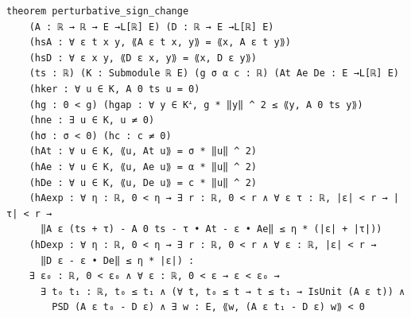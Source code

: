 \begin{theorem}[bp-325]
\begin{verbatim}
theorem perturbative_sign_change
    (A : ℝ → ℝ → E →L[ℝ] E) (D : ℝ → E →L[ℝ] E)
    (hsA : ∀ ε t x y, ⟪A ε t x, y⟫ = ⟪x, A ε t y⟫)
    (hsD : ∀ ε x y, ⟪D ε x, y⟫ = ⟪x, D ε y⟫)
    (ts : ℝ) (K : Submodule ℝ E) (g σ α c : ℝ) (At Ae De : E →L[ℝ] E)
    (hker : ∀ u ∈ K, A 0 ts u = 0)
    (hg : 0 < g) (hgap : ∀ y ∈ Kᗮ, g * ‖y‖ ^ 2 ≤ ⟪y, A 0 ts y⟫)
    (hne : ∃ u ∈ K, u ≠ 0)
    (hσ : σ < 0) (hc : c ≠ 0)
    (hAt : ∀ u ∈ K, ⟪u, At u⟫ = σ * ‖u‖ ^ 2)
    (hAe : ∀ u ∈ K, ⟪u, Ae u⟫ = α * ‖u‖ ^ 2)
    (hDe : ∀ u ∈ K, ⟪u, De u⟫ = c * ‖u‖ ^ 2)
    (hAexp : ∀ η : ℝ, 0 < η → ∃ r : ℝ, 0 < r ∧ ∀ ε τ : ℝ, |ε| < r → |τ| < r →
      ‖A ε (ts + τ) - A 0 ts - τ • At - ε • Ae‖ ≤ η * (|ε| + |τ|))
    (hDexp : ∀ η : ℝ, 0 < η → ∃ r : ℝ, 0 < r ∧ ∀ ε : ℝ, |ε| < r →
      ‖D ε - ε • De‖ ≤ η * |ε|) :
    ∃ ε₀ : ℝ, 0 < ε₀ ∧ ∀ ε : ℝ, 0 < ε → ε < ε₀ →
      ∃ t₀ t₁ : ℝ, t₀ ≤ t₁ ∧ (∀ t, t₀ ≤ t → t ≤ t₁ → IsUnit (A ε t)) ∧
        PSD (A ε t₀ - D ε) ∧ ∃ w : E, ⟪w, (A ε t₁ - D ε) w⟫ < 0
\end{verbatim}
\end{theorem}

